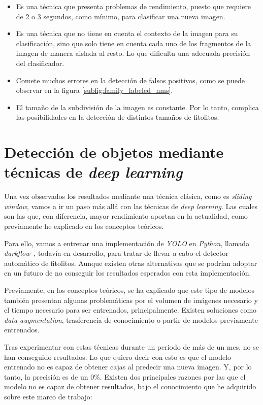 \begin{itemize}
	\item Es una técnica que presenta problemas de rendimiento, puesto que requiere de 2 o 3 segundos, como mínimo, para clasificar una nueva imagen.
	\item Es una técnica que no tiene en cuenta el contexto de la imagen para su clasificación, sino que solo tiene en cuenta cada uno de los fragmentos de la imagen de manera aislada al resto. Lo que dificulta una adecuada precisión del clasificador.
	\item Comete muchos errores en la detección de falsos positivos, como se puede observar en la figura \ref{subfig:family_labeled_nms}.
	\item El tamaño de la subdivisión de la imagen es constante. Por lo tanto, complica las posibilidades en la detección de distintos tamaños de fitolitos.
\end{itemize}

\section{Detección de objetos mediante técnicas de \textit{deep learning}}

Una vez observados los resultados mediante una técnica clásica, como es \textit{sliding window}, vamos a ir un paso más allá con las técnicas de \textit{deep learning}. Las cuales son las que, con diferencia, mayor rendimiento aportan en la actualidad, como previamente he explicado en los conceptos teóricos.

Para ello, vamos a entrenar una implementación de \textit{YOLO} en \textit{Python}, llamada \textit{darkflow}~\cite{darkflow}, todavía en desarrollo, para tratar de llevar a cabo el detector automático de fitolitos. Aunque existen otras alternativas que se podrían adoptar en un futuro de no conseguir los resultados esperados con esta implementación.

Previamente, en los conceptos teóricos, se ha explicado que este tipo de modelos también presentan algunas problemáticas por el volumen de imágenes necesario y el tiempo necesario para ser entrenados, principalmente. Existen soluciones como \textit{data augmentation}, trasferencia de conocimiento o partir de modelos previamente entrenados.

Tras experimentar con estas técnicas durante un periodo de más de un mes, no se han conseguido resultados. Lo que quiero decir con esto es que el modelo entrenado no es capaz de obtener cajas al predecir una nueva imagen. Y, por lo tanto, la precisión es de un 0\%. Existen dos principales razones por las que el modelo no es capaz de obtener resultados, bajo el conocimiento que he adquirido sobre este marco de trabajo:

